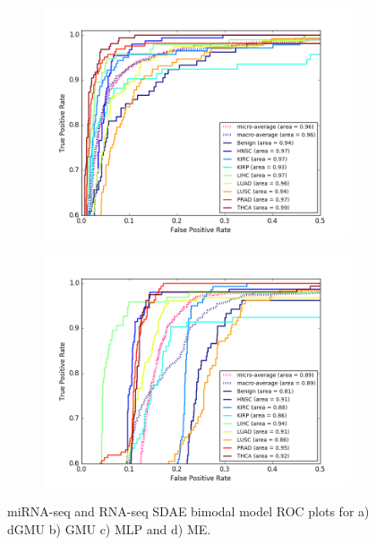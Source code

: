 \begin{figure}[H]
\begin{subfigure}[b]{0.49\textwidth}
         \caption{}
     \end{subfigure}
     \hfill
     \begin{subfigure}[b]{0.49\textwidth}
         \centering
         \includegraphics[width=\textwidth]{img/m_r/m_r_sdae_mlp_roc.png}
         \caption{}
     \end{subfigure}
     \begin{subfigure}[b]{0.49\textwidth}
         \centering
         \includegraphics[width=\textwidth]{img/m_r/m_r_sdae_moe_roc.png}
         \caption{}
     \end{subfigure}
        \caption{miRNA-seq and RNA-seq SDAE bimodal model ROC plots for a) dGMU b) GMU c) MLP and d) ME.}
        \label{fig:m_r_sdae_roc}
\end{figure}

